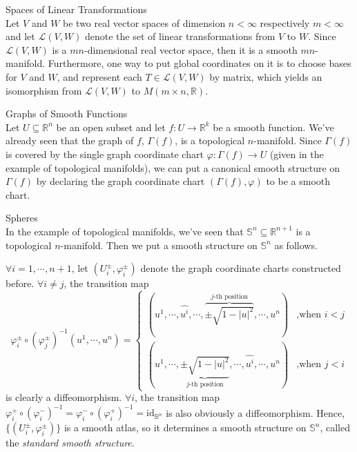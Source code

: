 \begin{example}{Spaces of Linear Transformations}\\
Let $V$ and $W$ be two real vector spaces of dimension $n<\infty$ respectively $m<\infty$ and let $\mathcal{L} (V,W)$ denote the set of linear transformations from $V$ to $W$. Since $\mathcal{L} (V,W)$ is a $mn$-dimensional real vector space, then it is a smooth $mn$-manifold. Furthermore, one way to put global coordinates on it is to choose bases for $V$ and $W$, and represent each $T\in \mathcal{L} (V,W)$ by matrix, which yields an isomorphism from $\mathcal{L} (V,W)$ to $M(m \times n,\mathbb{R})$.
\end{example}

\begin{example}{Graphs of Smooth Functions}\\
Let $U \subseteq \mathbb{R}^n$ be an open subset and let $f:U \to \mathbb{R}^k$ be a smooth function. We've already seen that the graph of $f$, $\Gamma(f)$, is a topological $n$-manifold. Since $\Gamma (f)$ is covered by the single graph coordinate chart $\varphi: \Gamma (f) \to U$ (given in the example of topological manifolds), we can put a canonical smooth structure on $\Gamma (f)$ by declaring the graph coordinate chart $(\Gamma (f), \varphi)$ to be a smooth chart.
\end{example}

\begin{example}{Spheres}\\
In the example of topological manifolds, we've seen that $\mathbb{S}^n \subseteq \mathbb{R} ^{n+1}$ is a topological $n$-manifold. Then we put a smooth structure on $\mathbb{S}^n$ as follows.

$\forall i=1 ,\cdots, n+1$, let $(U_i^{\pm} ,\varphi_i^{\pm})$ denote the graph coordinate charts constructed before. $\forall i\neq j$, the transition map
\[
\varphi_i^\pm \circ (\varphi_j^{\pm})^{-1} (u^1 ,\cdots, u^n)= \begin{cases}
    (u^1 ,\cdots, \widehat{u^i} ,\cdots, \overbrace{\pm \sqrt{1- |u|^2}} ^{j \text{-th position}} ,\cdots, u^n) &\text{,when } i<j\\
    (u^1 ,\cdots, \underbrace{\pm \sqrt{1-|u|^2}}_{j \text{-th position}} ,\cdots, \widehat{u^i} ,\cdots, u^n) &\text{,when }j<i
\end{cases}
\]
is clearly a diffeomorphism. $\forall i$, the transition map $\varphi^+_i \circ (\varphi^-_i)^{-1}= \varphi^-_i\circ (\varphi_i^+)^{-1}= \text{id}_{\mathbb{B}^n}$ is also obviously a diffeomorphism. Hence, $\{(U_i^\pm, \varphi_i^\pm)\}$ is a smooth atlas, so it determines a smooth structure on $\mathbb{S}^n$, called the \textit{standard smooth structure}.
\end{example}

